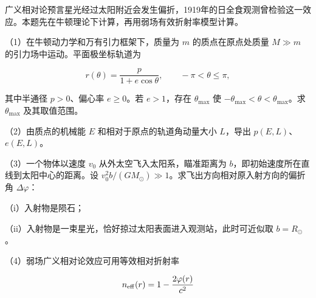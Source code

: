 \documentclass[12pt,a4paper,fontset=fandol]{ctexart}
\begin{document}
广义相对论预言星光经过太阳附近会发生偏折，1919年的日全食观测曾检验这一效应。本题先在牛顿理论下计算，再用弱场有效折射率模型计算。

（1）在牛顿动力学和万有引力框架下，质量为 \(m\) 的质点在原点处质量
\(M\gg m\) 的引力场中运动。平面极坐标轨道为

\[r(\theta)=\frac p{1+e\cos\theta},\qquad-\pi<\theta\le\pi,\]

其中半通径 \(p>0\)、偏心率 \(e\ge0\)。若 \(e>1\)，存在 \(\theta_{\max}\)
使 \(-\theta_{\max}<\theta<\theta_{\max}\)。求 \(\theta_{\max}\)
及其取值范围。

（2）由质点的机械能 \(E\) 和相对于原点的轨道角动量大小 \(L\)，导出
\(p(E,L)\)、\(e(E,L)\)。

（3）一个物体以速度 \(v_0\) 从外太空飞入太阳系，瞄准距离为
\(b\)，即初始速度所在直线到太阳中心的距离。设
\(v_0^2b/(GM_\odot)\gg1\)。求飞出方向相对原入射方向的偏折角
\(\Delta\varphi\)：

（i）入射物是陨石；

（ii）入射物是一束星光，恰好掠过太阳表面进入观测站，此时可近似取
\(b=R_\odot\)。

\begin{center}
\begin{minipage}{\linewidth}
\centering\begingroup
{}
\ifdim\wd\diagrambox>.88\linewidth
\sbox{\diagrambox}{\resizebox{.88\linewidth}{!}{\usebox{\diagrambox}}}
\fi
\ifdim\ht\diagrambox>.40\textheight
\resizebox{!}{.40\textheight}{\usebox{\diagrambox}}
\else\usebox{\diagrambox}\fi
\par{}
\endgroup\end{minipage}
\end{center}

（4）弱场广义相对论效应可用等效相对折射率

\[n_{\rm eff}(r)=1-\frac{2\varphi(r)}{c^2}\]
\end{document}
